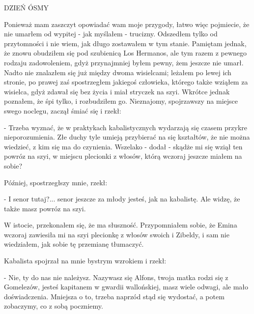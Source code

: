 





DZIEŃ ÓSMY

Ponieważ mam zaszczyt opowiadać wam moje przygody, łatwo więc
pojmiecie, że nie umarłem od wypitej - jak myślałem -
trucizny. Odszedłem tylko od przytomności i nie wiem, jak długo
zostawałem w tym stanie. Pamiętam jednak, że znowu obudziłem się pod
szubienicą Los Hermanos, ale tym razem z pewnego rodzaju zadowoleniem,
gdyż przynajmniej byłem pewny, żem jeszcze nie umarł. Nadto nie
znalazłem się już między dwoma wisielcami; leżałem po lewej ich
stronie, po prawej zaś spostrzegłem jakiegoś człowieka, którego także
wziąłem za wisielca, gdyż zdawał się bez życia i miał stryczek na
szyi. Wkrótce jednak poznałem, że śpi tylko, i rozbudziłem
go. Nieznajomy, spojrzawszy na miejsce swego noclegu, zaczął śmiać się
i rzekł:

- Trzeba wyznać, że w praktykach kabalistycznych wydarzają się czasem
przykre nieporozumienia. Złe duchy tyle umieją przybierać na się
kształtów, że nie można wiedzieć, z kim się ma do czynienia. Wszelako
- dodał - skądże mi się wziął ten powróz na szyi, w miejscu plecionki
z włosów, którą wczoraj jeszcze miałem na sobie?

Później, spostrzegłszy mnie, rzekł:

- I senor tutaj?... senor jeszcze za młody jesteś, jak na
kabalistę. Ale widzę, że także masz powróz na szyi.

W istocie, przekonałem się, że ma słuszność. Przypomniałem sobie, że
Emina wczoraj zawiesiła mi na szyi plecionkę z włosów swoich i
Zibeldy, i sam nie wiedziałem, jak sobie tę przemianę tłumaczyć.

Kabalista spojrzał na mnie bystrym wzrokiem i rzekł:

- Nie, ty do nas nie należysz. Nazywasz się Alfons, twoja matka rodzi
się z Gomelezów, jesteś kapitanem w gwardii wallońskiej, masz wiele
odwagi, ale mało doświadczenia. Mniejsza o to, trzeba naprzód stąd się
wydostać, a potem zobaczymy, co z sobą poczniemy.

